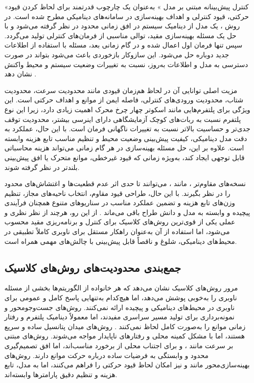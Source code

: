 «کنترل پیش‌بینانه مبتنی بر مدل%
»
به‌عنوان یک چارچوب قدرتمند برای لحاظ کردن قیود حرکتی، قیود کنترلی و اهداف بهینه‌سازی در سامانه‌های دینامیکی مطرح شده است. در روش ، یک مدل از دینامیک سیستم در افق زمانی محدود در نظر گرفته می‌شود و با حل یک مسئله بهینه‌سازی مقید، توالی مناسبی از فرمان‌های کنترلی تولید می‌گردد. سپس تنها فرمان اول اعمال شده و در گام زمانی بعد، مسئله با استفاده از اطلاعات جدید دوباره حل می‌شود. این سازوکار بازخوردی باعث می‌شود  بتواند در صورت دسترسی به مدل و اطلاعات به‌روز، نسبت به تغییرات وضعیت سیستم و محیط واکنش نشان دهد%
\cite{rawlings2009mpc,Bemporad1999}.

مزیت اصلی  توانایی آن در لحاظ هم‌زمان قیودی مانند محدودیت سرعت، محدودیت شتاب، محدودیت ورودی‌های کنترلی، فاصله ایمن از موانع و اهداف حرکتی است. این ویژگی برای پلتفرم‌هایی مانند اسکوتر چهار چرخ محرک اهمیت زیادی دارد، زیرا این نوع پلتفرم نسبت به ربات‌های کوچک آزمایشگاهی دارای اینرسی بیشتر، محدودیت توقف جدی‌تر و حساسیت بالاتر نسبت به تغییرات ناگهانی فرمان است. با این حال، عملکرد  به دقت مدل دینامیکی، کیفیت پیش‌بینی وضعیت محیط و تنظیم مناسب تابع هزینه وابسته است. علاوه بر این، حل مسئله بهینه‌سازی در هر گام زمانی می‌تواند هزینه محاسباتی قابل توجهی ایجاد کند، به‌ویژه زمانی که قیود غیرخطی، موانع متحرک یا افق پیش‌بینی بلندتر در نظر گرفته شوند.

نسخه‌های مقاوم‌تر ، مانند ، می‌توانند تا حدی اثر عدم قطعیت‌ها و اغتشاش‌های محدود را در نظر بگیرند. با این حال، طراحی قیود مقاوم، انتخاب ناحیه‌های مجاز، تنظیم وزن‌های تابع هزینه و تضمین عملکرد مناسب در سناریوهای متنوع همچنان فرآیندی پیچیده و وابسته به مدل و دانش طراح باقی می‌ماند%
\cite{Mayne2005TubeMPC}.
از این رو، هرچند  از نظر نظری و عملی یکی از قوی‌ترین روش‌های کلاسیک برای کنترل و برنامه‌ریزی مقید محسوب می‌شود، اما استفاده از آن به‌عنوان راهکار مستقل برای ناوبری کاملاً تطبیقی در محیط‌های دینامیکی، شلوغ و ناقصاً قابل پیش‌بینی با چالش‌های مهمی همراه است.

\subsection{جمع‌بندی محدودیت‌های روش‌های کلاسیک}

مرور روش‌های کلاسیک نشان می‌دهد که هر خانواده از الگوریتم‌ها بخشی از مسئله ناوبری را به‌خوبی پوشش می‌دهد، اما هیچ‌کدام به‌تنهایی پاسخ کامل و عمومی برای ناوبری در محیط‌های دینامیکی و پیچیده ارائه نمی‌کنند. روش‌های جست‌وجومحور و نمونه‌برداری برای تولید مسیر سراسری مفیدند، اما معمولاً دینامیک پلتفرم و رفتار زمانی موانع را به‌صورت کامل لحاظ نمی‌کنند%
\cite{s25113394,alvarez2024DRLsurvey}. %
 روش‌های میدان پتانسیل ساده و سریع هستند، اما با مشکل کمینه محلی و رفتارهای ناپایدار مواجه می‌شوند. روش‌های مبتنی بر سرعت مانند ،  و  برای اجتناب محلی از برخورد مناسب‌اند، اما افق تصمیم‌گیری محدود و وابستگی به فرضیات ساده درباره حرکت موانع دارند. روش‌های بهینه‌سازی‌محور مانند  و  نیز امکان لحاظ قیود حرکتی را فراهم می‌کنند، اما به مدل، تابع هزینه و تنظیم دقیق پارامترها وابسته‌اند.

